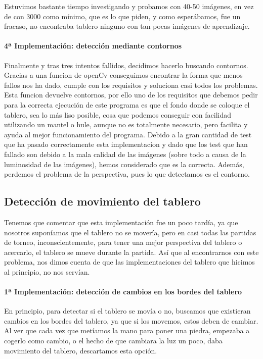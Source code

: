 \documentclass[12pt,a4paper]{report}
\begin{document}
Estuvimos bastante tiempo investigando y probamos con 40-50 imágenes, en vez de
con 3000 como mínimo, que es lo que piden, y como esperábamos, fue un fracaso,
no encontraba tablero ninguno con tan pocas imágenes de aprendizaje. 

\paragraph{4ª Implementación: detección mediante contornos}

Finalmente y tras tres intentos fallidos, decidimos hacerlo buscando contornos.
Gracias a una funcion de openCv conseguimos encontrar la forma que menos fallos
nos ha dado, cumple con los requisitos y soluciona casi todos los problemas.
Esta funcion devuelve contornos, por ello uno de los requisitos que debemos
pedir para la correcta ejecución de este programa es que el fondo donde se
coloque el tablero, sea lo más liso posible, cosa que podemos conseguir con
facilidad utilizando un mantel o hule, aunque no es totalmente necesario, pero
facilita y ayuda al mejor funcionamiento del programa. Debido a la gran cantidad
de test que ha pasado correctamente esta implementacion y dado que los test que
han fallado son debido a la mala calidad de las imágenes (sobre todo a causa de
la luminosidad de las imágenes), hemos considerado que es la correcta. Además,
perdemos el problema de la perspectiva, pues lo que detectamos es el contorno.


\subsection{Detección de movimiento del tablero}

Tenemos que comentar que esta implementación fue un poco tardía, ya que nosotros
suponíamos que el tablero no se movería, pero en casi todas las partidas de
torneo, inconscientemente, para tener una mejor perspectiva del tablero o
acercarlo, el tablero se mueve durante la partida. Así que al encontrarnos con
este problema, nos dimos cuenta de que las implementaciones del tablero que
hicimos al principio, no nos servían. 

\paragraph{1ª Implementación: detección de cambios en los bordes del tablero}

En principio, para detectar si el tablero se movía o no, buscamos que existieran
cambios en los bordes del tablero, ya que si los movemos, estos deben de
cambiar. Al ver que cada vez que metíamos la mano para poner una piedra,
empezaba a cogerlo como cambio, o el hecho de que cambiara la luz un poco, daba
movimiento del tablero, descartamos esta opción. 
\end{document}
